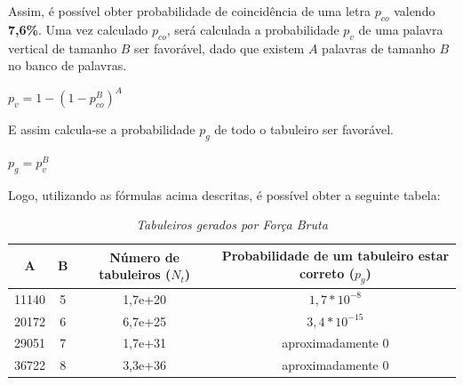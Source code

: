 Assim, é possível obter probabilidade de coincidência de uma letra $p_{co}$ valendo \textbf{7,6\%}. Uma vez calculado $p_{co}$, será calculada a probabilidade $p_{v}$ de uma palavra vertical de tamanho $B$ ser favorável, dado que existem $A$ palavras de tamanho $B$ no banco de palavras. 

\begin{center}
    \Large{$p_{v} = 1 - (1 - p_{co}^{B})^{A}$}
\end{center}

E assim calcula-se a probabilidade $p_{g}$ de todo o tabuleiro ser favorável.

\begin{center}
    \Large{$p_{g} = p_{v}^{B}$}
\end{center}

Logo, utilizando as fórmulas acima descritas, é possível obter a seguinte tabela:


\begin{table}[!ht]
\caption{\textit{Tabuleiros gerados por Força Bruta}}
\centering
\footnotesize
\begin{tabular}{|c|c|c|c|}
\toprule
\textbf{A} & \textbf{B} & \textbf{Número de tabuleiros ($N_{t}$)} & \textbf{Probabilidade de um tabuleiro estar correto ($p_{g}$)} \\ \hline
11140      & 5          & 1,7e+20 & $1,7*10^{-8}$                      \\ \hline
20172      & 6          & 6,7e+25 & $3,4*10^{-15}$                      \\ \hline
29051      & 7          & 1,7e+31 & aproximadamente 0                      \\ \hline
36722      & 8          & 3,3e+36 & aproximadamente 0                      
\end{tabular}
\label{tab:tabForBru}
\end{table}

